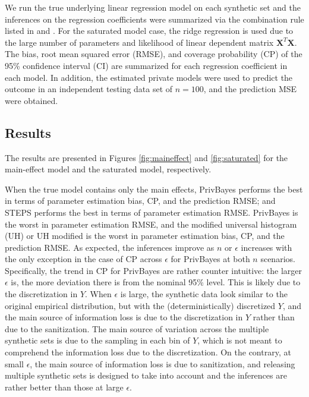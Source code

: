 \documentclass[12pt, A4]{article}
\theoremstyle{plain}
\theoremstyle{exampstyle}\newtheorem{defn}{Definition}
\theoremstyle{exampstyle}\newtheorem{lem}{Lemma}
\theoremstyle{exampstyle}\newtheorem{cor}{Corollary}
\theoremstyle{exampstyle}\newtheorem{pro}{Proposition}
\theoremstyle{exampstyle}\newtheorem{cla}{Claim}
\theoremstyle{exampstyle}\newtheorem{rem}{Remark}
\begin{document}
We run the true underlying linear regression model on each synthetic set and the inferences on the regression coefficients were summarized via the combination rule listed in \citet{liu2016model} and \citet{bowen2016differentially}. For the saturated model case, the ridge regression is used due to the large number of parameters and likelihood of linear dependent matrix $\mathbf{X}^T\mathbf{X}$. The bias, root mean squared error (RMSE), and coverage probability (CP) of the 95\% confidence interval (CI) are summarized for each regression coefficient in each model. In addition, the estimated private models were used to predict the outcome in an independent testing data set of $n=100$, and the prediction MSE were obtained.

\subsection{Results}
The results are presented in Figures \ref{fig:maineffect} and \ref{fig:saturated} for the main-effect model and the saturated model, respectively. 

When the true model contains only the main effects, PrivBayes performs the best in terms of parameter estimation bias, CP, and the prediction RMSE; and STEPS performs the best in terms of parameter estimation RMSE. PrivBayes is the worst in parameter estimation RMSE, and the modified universal histogram (UH) or UH modified is the worst in parameter estimation bias, CP, and the prediction RMSE. As expected, the inferences improve as $n$ or $\epsilon$ increases with the only exception in the case of CP across $\epsilon$ for PrivBayes at both $n$ scenarios. Specifically, the trend in CP for PrivBayes are rather counter intuitive: the larger $\epsilon$ is, the more deviation there is from the nominal 95\% level. This is likely due to the discretization in $Y$. When $\epsilon$ is large, the synthetic data look similar to the original empirical distribution, but with the (deterministically) discretized $Y$, and the main source of information loss is due to the discretization in $Y$ rather than due to the sanitization. The main source of variation across the multiple synthetic sets is due to the sampling in each bin of $Y$, which is not meant to comprehend the information loss due to the discretization. On the contrary, at small $\epsilon$, the main source of information loss is due to sanitization, and releasing multiple synthetic sets is designed to take into account and the inferences are rather better than those at large $\epsilon$.
\end{document}
